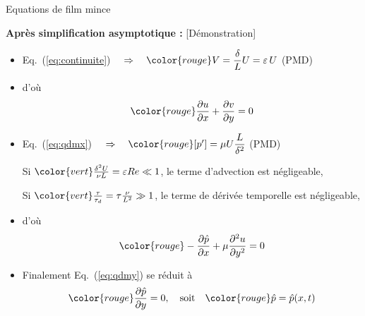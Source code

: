 \begin{frame}{Equations de film mince}

\small

\textbf{Après simplification asymptotique :} \hfill \textcolor{gris}{[Démonstration]}

\bigskip

\begin{itemize}
\item
	Eq.~(\ref{eq:continuite}) 
	$\quad \Rightarrow \quad \color{rouge} V = \dfrac{\delta}{L} U = \varepsilon \, U$ \quad (PMD)
\item[] d'où
	\begin{equation}
		\color{rouge}
		\dpdx{u} + \dpdy{v} = 0
	\end{equation}
\item
	Eq.~(\ref{eq:qdmx}) $\quad \Rightarrow \quad \color{rouge} [p'] = \mu U \dfrac{L}{\delta^2}$ \quad (PMD)
	
	\quad Si $\color{vert} \frac{\delta^2  U}{\nu L} = \varepsilon Re \ll 1$, le terme d'advection est négligeable,
	
	\quad Si $\color{vert} \frac{\tau}{\tau_d} = \tau \frac{ \nu}{L^2} \gg 1$, le terme de dérivée temporelle est négligeable,
	
\item[] d'où
	\begin{equation}
		\color{rouge}
		-\dpdx{\hat{p}} + \mu \ddpdy{u} = 0
	\end{equation}
\item
	Finalement Eq.~(\ref{eq:qdmy}) se réduit à
	\begin{equation}
		{\color{rouge}
		\dpdy{\hat{p}} = 0},
		\quad \mbox{soit} \quad \color{rouge}\hat{p} = \hat{p}(x, t)
	\end{equation}
\end{itemize}


\small

\vspace{10mm}

\end{frame}

